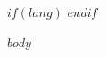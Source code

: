 \documentclass[fleqn,$fontsize$]{latex/stylish_article} %
\affiliation{
$for(affiliation)$\textsuperscript{$affiliation.affsuperscript$}$affiliation.dptuniv$\\ \hspace{1em} $affiliation.address$$sep$\\$endfor$
}
\affiliation{*\textbf{$corrauthorlabel$}: $corrauthor.email$$if(corrauthor.url)$, $corrauthor.url$$endif$} %
\begin{document}
$if(lang)$
$endif$

\flushbottom %

\maketitle %

\tableofcontents %

\thispagestyle{empty} %


$body$



\makeatletter

\makeatother


\end{document}
